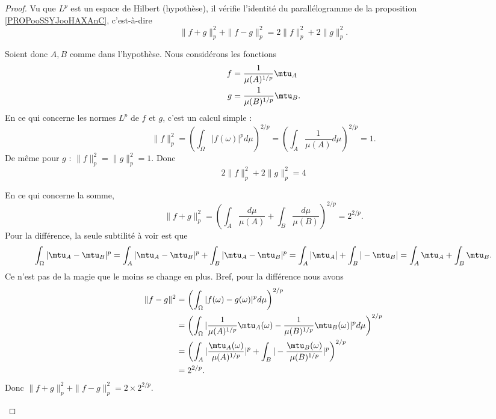 \begin{proof}
	Vu que \( L^p\) est un espace de Hilbert (hypothèse), il vérifie l'identité du parallélogramme de la proposition \ref{PROPooSSYJooHAXAnC}, c'est-à-dire
	\begin{equation}        \label{EQooAKKYooURIbvi}
		\| f+g \|^2_p+\| f-g \|^2_p=2\| f \|_p^2+2\| g \|^2_p.
	\end{equation}

	\begin{subproof}


		Soient donc \( A,B\) comme dans l'hypothèse. Nous considérons les fonctions
		\begin{subequations}
			\begin{align}
				f & =\frac{1}{ \mu(A)^{1/p} }\mtu_A  \\
				g & =\frac{1}{ \mu(B)^{1/p} }\mtu_B.
			\end{align}
		\end{subequations}
		En ce qui concerne les normes \( L^p\) de \( f\) et \( g\), c'est un calcul simple :
		\begin{equation}
			\| f \|_p^2=\left( \int_{\Omega}| f(\omega) |^pd\mu \right)^{2/p}=\left( \int_A\frac{1}{ \mu(A) }d\mu \right)^{2/p}=1.
		\end{equation}
		De même pour \( g\) : \( \| f \|_p^2=\| g \|_p^2=1\). Donc
		\begin{equation}
			2\| f \|_p^2+2\| g \|_p^2=4
		\end{equation}

		En ce qui concerne la somme,
		\begin{equation}
			\| f+g \|_p^2=\left( \int_A\frac{ d\mu }{ \mu(A) }+\int_B\frac{d\mu}{ \mu(B) } \right)^{2/p}=2^{2/p}.
		\end{equation}
		Pour la différence, la seule subtilité à voir est que
		\begin{equation}
			\int_{\Omega}| \mtu_A-\mtu_B |^p=
			\int_A| \mtu_A-\mtu_B |^p+\int_B| \mtu_A-\mtu_B |^p
			=\int_A| \mtu_A |+\int_B| -\mtu_B |=\int_A\mtu_A+\int_B\mtu_B.
		\end{equation}
		Ce n'est pas de la magie que le moins se change en plus. Bref, pour la différence nous avons
		\begin{subequations}
			\begin{align}
				\| f-g \|^2 & =\left( \int_{\Omega}| f(\omega)-g(\omega) |^pd\mu \right)^{2/p}                                                                     \\
				            & =\left( \int_{\Omega}| \frac{1}{ \mu(A)^{1/p} }\mtu_A(\omega)-\frac{1}{ \mu(B)^{1/p} }\mtu_B(\omega) |^pd\mu \right)^{2/p}           \\
				            & =\left( \int_A| \frac{ \mtu_A(\omega) }{ \mu(A)^{1/p} } |^p   +\int_B| -\frac{ \mtu_B(\omega) }{ \mu(B)^{1/p} } |^p    \right)^{2/p} \\
				            & =2^{2/p}.
			\end{align}
		\end{subequations}
		Donc \( \| f+g \|^{2}_p+\| f-g \|_p^2=2\times 2^{2/p}\).


\end{subproof}
\end{proof}
